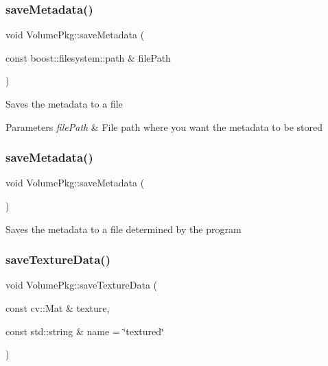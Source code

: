 \subsubsection{\texorpdfstring{save\+Metadata()}{saveMetadata()}\hspace{0.1cm}{\footnotesize\ttfamily [1/2]}}
{\footnotesize\ttfamily void Volume\+Pkg\+::save\+Metadata (\begin{DoxyParamCaption}\item[{const boost\+::filesystem\+::path \&}]{file\+Path }\end{DoxyParamCaption})}

Saves the metadata to a file 
\begin{DoxyParams}{Parameters}
{\em file\+Path} & File path where you want the metadata to be stored \\
\hline
\end{DoxyParams}
\hypertarget{classVolumePkg_a49a81e85ddb0fb188efdeb357592b99f}{}\label{classVolumePkg_a49a81e85ddb0fb188efdeb357592b99f} 
\subsubsection{\texorpdfstring{save\+Metadata()}{saveMetadata()}\hspace{0.1cm}{\footnotesize\ttfamily [2/2]}}
{\footnotesize\ttfamily void Volume\+Pkg\+::save\+Metadata (\begin{DoxyParamCaption}{ }\end{DoxyParamCaption})}

Saves the metadata to a file determined by the program \hypertarget{classVolumePkg_ad13a7fb165caa0d3537942907a3e3cad}{}\label{classVolumePkg_ad13a7fb165caa0d3537942907a3e3cad} 
\subsubsection{\texorpdfstring{save\+Texture\+Data()}{saveTextureData()}\hspace{0.1cm}{\footnotesize\ttfamily [1/2]}}
{\footnotesize\ttfamily void Volume\+Pkg\+::save\+Texture\+Data (\begin{DoxyParamCaption}\item[{const cv\+::\+Mat \&}]{texture,  }\item[{const std\+::string \&}]{name = {\ttfamily \char`\"{}textured\char`\"{}} }\end{DoxyParamCaption})}

